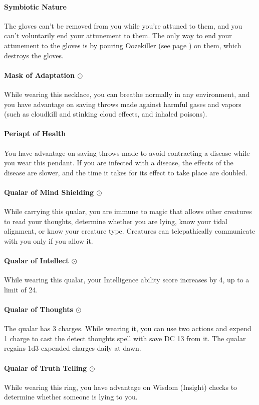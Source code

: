         \paragraph{Symbiotic Nature}
        The gloves can't be removed from you while you're attuned to them, and you can't voluntarily end your attunement to them.
        The only way to end your attunement to the gloves is by pouring Oozekiller (see page \pageref{item::oozekiller}) on them, which destroys the gloves.
    \paragraph{Mask of Adaptation $\odot$}
        While wearing this necklace, you can breathe normally in any environment, and you have advantage on saving throws made against harmful gases and vapors (such as cloudkill and stinking cloud effects, and inhaled poisons).
    \paragraph{Periapt of Health}
        You have advantage on saving throws made to avoid contracting a disease while you wear this pendant.
        If you are infected with a disease, the effects of the disease are slower, and the time it takes for its effect to take place are doubled.
    \paragraph{Qualar of Mind Shielding $\odot$}
        While carrying this qualar, you are immune to magic that allows other creatures to read your thoughts, determine whether you are lying, know your tidal alignment, or know your creature type.
        Creatures can telepathically communicate with you only if you allow it.
    \paragraph{Qualar of Intellect $\odot$}
        While wearing this qualar, your Intelligence ability score increases by 4, up to a limit of 24.
    \paragraph{Qualar of Thoughts $\odot$}
        The qualar has 3 charges.
        While wearing it, you can use two actions and expend 1 charge to cast the detect thoughts spell with save DC 13 from it.
        The qualar regains 1d3 expended charges daily at dawn.
    \paragraph{Qualar of Truth Telling $\odot$}
        While wearing this ring, you have advantage on Wisdom (Insight) checks to determine whether someone is lying to you.
